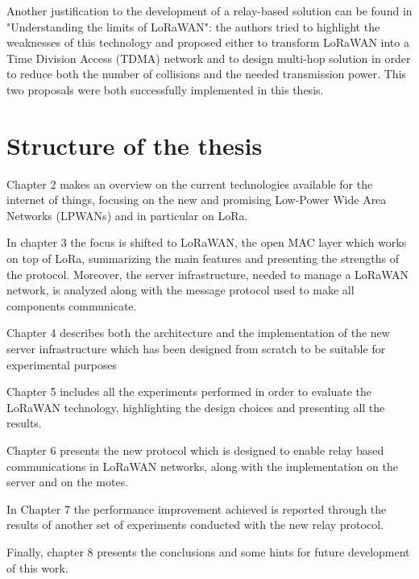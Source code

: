 Another justification to the development of a relay-based solution can be found in "Understanding the limits of LoRaWAN"\cite{lorawanlimits}: the authors tried to highlight the weaknesses of this technology and proposed either to transform LoRaWAN into a Time Division Access (TDMA) network and to design multi-hop solution in order to reduce both the number of collisions and the needed transmission power. This two proposals were both successfully implemented in this thesis.

\section{Structure of the thesis}
Chapter 2 makes an overview on the current technologies available for the internet of things, focusing on the new and promising Low-Power Wide Area Networks (LPWANs) and in particular on LoRa.

In chapter 3 the focus is shifted to LoRaWAN, the open MAC layer which works on top of LoRa, summarizing the main features and presenting the strengths of the protocol. Moreover, the server infrastructure, needed to manage a LoRaWAN network, is analyzed along with the message protocol used to make all components communicate.

Chapter 4 describes both the architecture and the implementation of the new server infrastructure which has been designed from scratch to be suitable for experimental purposes

Chapter 5 includes all the experiments performed in order to evaluate the LoRaWAN technology, highlighting the design choices and presenting all the results.

Chapter 6 presents the new protocol which is designed to enable relay based communications in LoRaWAN networks, along with the implementation on the server and on the motes. 

In Chapter 7 the performance improvement achieved is reported through the results of another set of experiments conducted with the new relay protocol.

Finally, chapter 8 presents the conclusions and some hints for future development of this work.
